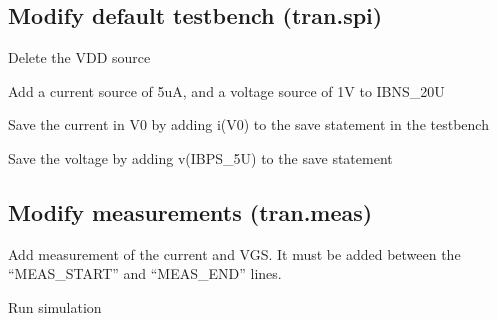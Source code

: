 \begin{Shaded}
\begin{Highlighting}[]
\end{Highlighting}
\end{Shaded}

\subsection{Modify default testbench
(tran.spi)}\label{modify-default-testbench-tran.spi}

Delete the VDD source

Add a current source of 5uA, and a voltage source of 1V to IBNS\_20U

\begin{Shaded}
\begin{Highlighting}[]
\end{Highlighting}
\end{Shaded}

Save the current in V0 by adding i(V0) to the save statement in the
testbench

Save the voltage by adding v(IBPS\_5U) to the save statement

\begin{Shaded}
\begin{Highlighting}[]
\end{Highlighting}
\end{Shaded}

\subsection{Modify measurements
(tran.meas)}\label{modify-measurements-tran.meas}

Add measurement of the current and VGS. It must be added between the
``MEAS\_START'' and ``MEAS\_END'' lines.

\begin{Shaded}
\begin{Highlighting}[]
\end{Highlighting}
\end{Shaded}

Run simulation

\begin{Shaded}
\begin{Highlighting}[]
\end{Highlighting}
\end{Shaded}

